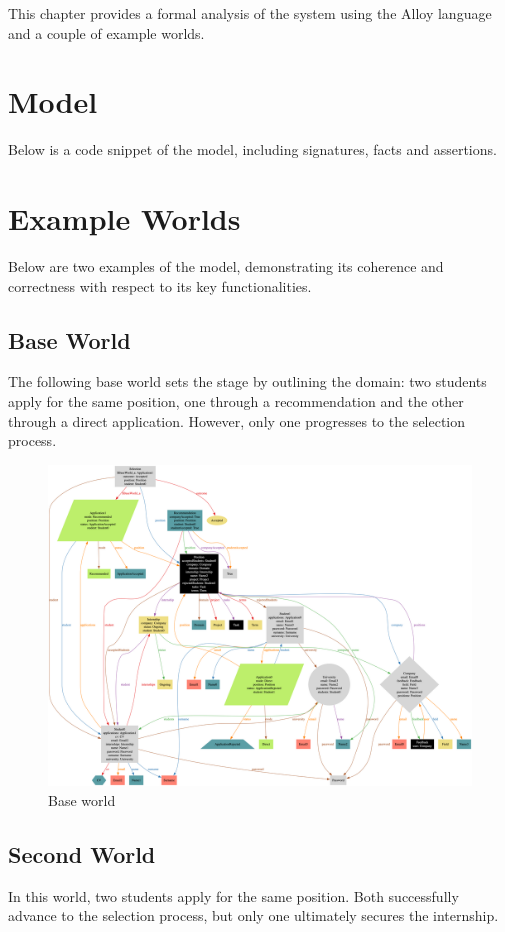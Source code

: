 This chapter provides a formal analysis of the system using the Alloy language and a couple of example worlds.

\section{Model}
Below is a code snippet of the model, including signatures, facts and assertions.



\section{Example Worlds}
Below are two examples of the model, demonstrating its coherence and correctness with respect to its key functionalities.

\subsection{Base World}
The following base world sets the stage by outlining the domain: two students apply for the same position, one through a recommendation and the other through a direct application.
However, only one progresses to the selection process.

\begin{figure}[h]
    \centering
    \includegraphics[width=16cm]{images/example-worlds/base.png}
    \caption{Base world}
\end{figure}

\subsection{Second World}
In this world, two students apply for the same position. Both successfully advance to the selection process, but only one ultimately secures the internship.

